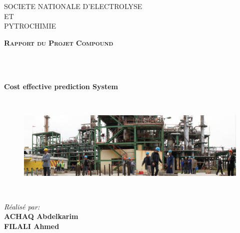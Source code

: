 \documentclass[11pt]{report}
\begin{document}
\begin{center}
	\textsc{\large 
	\large 	SOCIETE NATIONALE D'ELECTROLYSE\\ \vspace{0.2cm}
\large ET\\ \vspace{0.2cm}
\large PYTROCHIMIE
  }\\[2cm]	
	
	\begin{minipage}{1\textwidth} 
		\begin{center}
			\textsc{\Large \textbf{Rapport du Projet Compound}} \\ [0.3cm]
		\end{center}
	\end{minipage}\\[0.3cm]


	
	
	
	\vspace*{0.5cm}	
	\HRule \\[0.05cm]	
	\begin{center} 
		\LARGE \bfseries{
			Cost effective prediction System
		}\\[0.3cm]
	\end{center}		
	\HRule \\[0.6cm]
	
	\begin{figure}[H]
		\begin{center}
			\includegraphics[width=12cm]{images/couvert.jpg}
			\label{fig:figure}
		\end{center}
	\end{figure}

\begin{minipage}{1\textwidth}												

\end{minipage}\\[2cm]
	
	
	\begin{minipage}{1\textwidth}												
		\begin{center}	 \large															
			\emph{Réalisé par:}\\[0.3cm]
			\textbf{ACHAQ Abdelkarim } \\
			\textbf{FILALI Ahmed } \\
		

\end{center}
\end{minipage}
\end{center}
\end{document}
